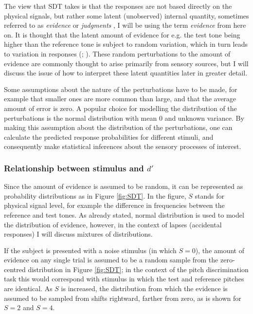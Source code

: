 \documentclass{article}\usepackage{knitr}
\begin{document}
The view that SDT takes is that the responses are not based directly on the physical signals, but rather some latent (unobserved) internal quantity, sometimes referred to as \textit{evidence} \citep{wickens2002} or \textit{judgments} \cite{stigler2003}, I will be using the term \textit{evidence} from here on. It is thought that the latent amount of evidence for e.g. the test tone being higher than the reference tone is subject to random variation, which in turn leads to variation in responses (\citealt[p. 154]{kingdomprins2010}; \citealt[p. 11]{wickens2002}). These random perturbations to the amount of evidence are commonly thought to arise primarily from sensory sources, but I will discuss the issue of how to interpret these latent quantities later in greater detail.

Some assumptions about the nature of the perturbations have to be made, for example that smaller ones are more common than large, and that the average amount of error is zero. A popular choice for modelling the distribution of the perturbations is the normal distribution with mean 0 and unknown variance. By making this assumption about the distribution of the perturbations, one can calculate the predicted response probabilities for different stimuli, and consequently make statistical inferences about the sensory processes of interest. 

\subsubsection{Relationship between stimulus and $d'$}

Since the amount of evidence is assumed to be random, it can be represented as probability distributions as in Figure \ref{fig:SDT}. In the figure, $S$ stands for physical signal level, for example the difference in frequencies between the reference and test tones. As already stated, normal distribution is used to model the distribution of evidence, however, in the context of lapses (accidental responses) I will discuss mixtures of distributions.

If the subject is presented with a noise stimulus (in which $S = 0$), the amount of evidence on any single trial is assumed to be a random sample from the zero-centred distribution in Figure \ref{fig:SDT}; in the context of the pitch discrimination task this would correspond with stimulus in which the test and reference pitches are identical. As $S$ is increased, the distribution from which the evidence is assumed to be sampled from shifts rightward, farther from zero, as is shown for $S = 2$ and $S = 4$.
\end{document}

